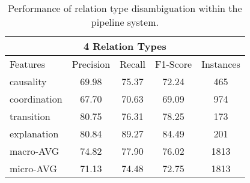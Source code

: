 \begin{table}[ht]
\centering
\begin{tabular}{|l|c|c|c|c|}
\hline

\multicolumn{5}{|c|}{4 Relation Types}                                              \\ \hline
    Features            &     Precision &     Recall &     F1-Score &     Instances \\ \hline
    causality           &     69.98     &     75.37  &     72.24    &     465       \\ \hline
    coordination        &     67.70     &     70.63  &     69.09    &     974       \\ \hline
    transition          &     80.75     &     76.31  &     78.25    &     173       \\ \hline
    explanation         &     80.84     &     89.27  &     84.49    &     201       \\ \hline
    macro-AVG           &     74.82     &     77.90  &     76.02    &     1813      \\ \hline
    micro-AVG           &     71.13     &     74.48  &     72.75    &     1813      \\ \hline

\end{tabular}
\caption{\label{t:sense-types-pipeline} Performance of relation type
disambiguation within the pipeline system. }
\end{table}
